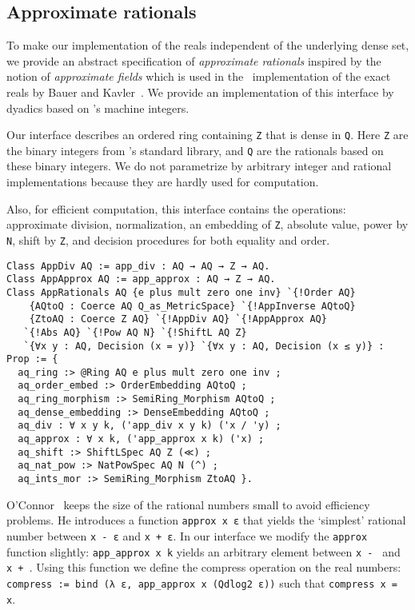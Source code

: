 \documentclass[a4paper,10pt,runningheads]{llncs}
\begin{document}
\subsection{Approximate rationals}\label{section:approx_rationals}
To make our implementation of the reals independent of the underlying dense set, we provide an abstract specification of \emph{approximate rationals} inspired by the notion of \emph{approximate fields} which is used in the \Haskell\ implementation of the exact reals by Bauer and Kavler~\cite{BauerKavkler}. We provide an implementation of this interface by dyadics based on \Coq's machine integers.

Our interface describes an ordered ring containing \lstinline|Z| that is dense in \lstinline|Q|. Here \lstinline|Z| are the binary integers from \Coq's standard library, and \lstinline|Q| are the rationals based on these binary integers. We do not parametrize by arbitrary integer and rational implementations because they are hardly used for computation.

Also, for efficient computation, this interface contains the operations: approximate division, normalization, an embedding of \lstinline|Z|, absolute value, power by \lstinline|N|, shift by \lstinline|Z|, and decision procedures for both equality and order.
\begin{lstlisting}
Class AppDiv AQ := app_div : AQ → AQ → Z → AQ.
Class AppApprox AQ := app_approx : AQ → Z → AQ.
Class AppRationals AQ {e plus mult zero one inv} `{!Order AQ} 
	{AQtoQ : Coerce AQ Q_as_MetricSpace} `{!AppInverse AQtoQ} 
	{ZtoAQ : Coerce Z AQ} `{!AppDiv AQ} `{!AppApprox AQ} 
   `{!Abs AQ} `{!Pow AQ N} `{!ShiftL AQ Z} 
   `{∀x y : AQ, Decision (x = y)} `{∀x y : AQ, Decision (x ≤ y)} : Prop := {
  aq_ring :> @Ring AQ e plus mult zero one inv ;
  aq_order_embed :> OrderEmbedding AQtoQ ;
  aq_ring_morphism :> SemiRing_Morphism AQtoQ ;
  aq_dense_embedding :> DenseEmbedding AQtoQ ;
  aq_div : ∀ x y k, ('app_div x y k) ('x / 'y) ;
  aq_approx : ∀ x k, ('app_approx x k) ('x) ;
  aq_shift :> ShiftLSpec AQ Z (≪) ;
  aq_nat_pow :> NatPowSpec AQ N (^) ;
  aq_ints_mor :> SemiRing_Morphism ZtoAQ }.
\end{lstlisting}
O'Connor~\cite{OConnor:mscs} keeps the size of the rational numbers small to avoid efficiency problems. He introduces a function \mbox{\lstinline|approx x ε|} that yields the `simplest' rational number between \lstinline|x - ε| and \lstinline|x + ε|. In our interface we modify the \lstinline|approx| function slightly: \lstinline|app_approx x k| yields an arbitrary element between \lstinline|x - | and \mbox{\lstinline|x + |.}
Using this function we define the compress operation on the real numbers: \mbox{\lstinline|compress := bind (λ ε, app_approx x (Qdlog2 ε))|} such that \lstinline|compress x = x|.
\end{document}

